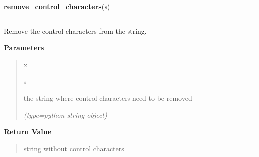     \label{db:remove_control_characters}

    \vspace{0.5ex}

\hspace{.8\funcindent}\begin{boxedminipage}{\funcwidth}

    \raggedright \textbf{remove\_control\_characters}(\textit{s})

    \vspace{-1.5ex}

    \rule{\textwidth}{0.5\fboxrule}
\setlength{\parskip}{2ex}
    Remove the control characters from the string.

\setlength{\parskip}{1ex}
      \textbf{Parameters}
      \vspace{-1ex}

      \begin{quote}
        \begin{Ventry}{x}

          \item[s]

          the string where control characters need to be removed

            {\it (type=python string object)}

        \end{Ventry}

      \end{quote}

      \textbf{Return Value}
    \vspace{-1ex}

      \begin{quote}
      string without control characters

      \end{quote}

    \end{boxedminipage}

    \label{db:updateDB}

    \vspace{0.5ex}

